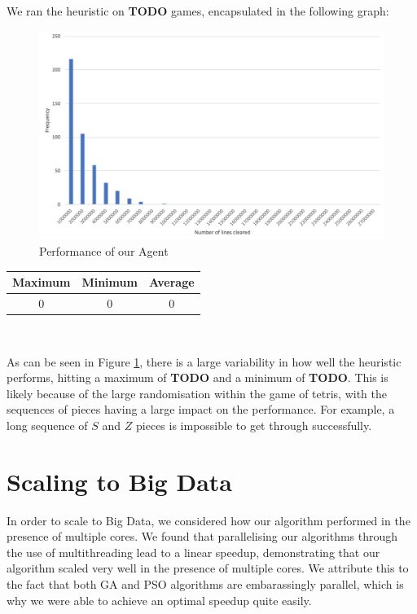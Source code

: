 \documentclass[12pt]{article}
\begin{document}
	We ran the heuristic on \textbf{TODO} games, encapsulated in the following graph:\\

	\begin{figure}[h]
		\includegraphics[scale=0.3]{heuristic/heuristic}
		\centering
		\caption{Performance of our Agent}
		\label{fig:agent}
	\end{figure}

	\vspace{-4mm}
	\begin{center}
		\begin{tabular}{ | c | c | c | }
			\hline
			Maximum & Minimum & Average \\ \hline
			0 & 0 & 0 \\ \hline
		\end{tabular}\\
	\end{center}

	As can be seen in Figure \ref{fig:agent}, there is a large variability in how
	well the heuristic performs, hitting a maximum of \textbf{TODO} and a minimum of \textbf{TODO}.
	This is likely because of the large randomisation within the game of tetris,
	with the sequences of pieces having a large impact on the performance. For example,
	a long sequence of $S$ and $Z$ pieces is impossible to get through successfully.

    \section{Scaling to Big Data}
	In order to scale to Big Data, we considered how our algorithm performed in the presence
	of multiple cores. We found that parallelising our algorithms through the use
	of multithreading lead to a linear speedup, demonstrating that our algorithm scaled very
	well in the presence of multiple cores. We attribute this to the fact that
	both GA and PSO algorithms are embarassingly parallel, which
	is why we were able to achieve an optimal speedup quite easily.\\
\end{document}
